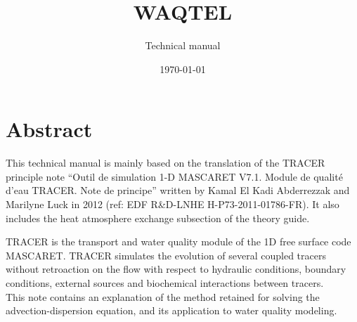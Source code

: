 \documentclass[Waqtel]{../../data/TelemacDoc} %
\begin{document}
\let\cleardoublepage\clearpage
\title{WAQTEL}
\subtitle{Technical manual}
\version{\telmaversion}
\date{\today}
\maketitle
\clearpage




\pagestyle{empty} %

\tableofcontents%


\pagestyle{fancy} %

\thispagestyle{empty}

\chapter*{Abstract}
This technical manual is mainly based on the translation of the TRACER principle note
``Outil de simulation 1-D MASCARET V7.1. Module de qualité d'eau TRACER. Note de principe''
written by Kamal El Kadi Abderrezzak and Marilyne Luck in 2012
\cite{elkadi_tracer_2012} (ref: EDF R\&D-LNHE H-P73-2011-01786-FR).
It also includes the heat atmosphere exchange subsection of the  theory guide.

TRACER is the transport and water quality module of the 1D free surface code MASCARET.
TRACER simulates the evolution of several coupled tracers
without retroaction on the flow with respect to hydraulic conditions,
boundary conditions, external sources and biochemical interactions between tracers.\\

This note contains an explanation of the method retained for solving the advection-dispersion equation,
and its application to water quality modeling.
\end{document}
